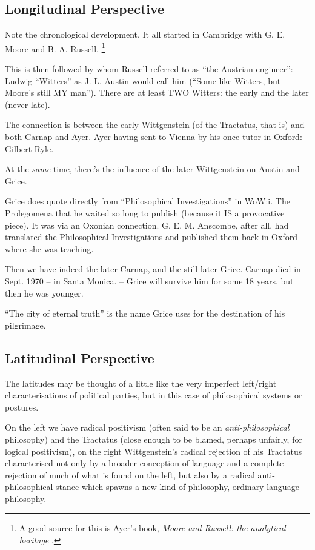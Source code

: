 \documentclass[10pt,titlepage]{book}
\begin{document}
\subsection{Longitudinal Perspective}

Note the chronological development.
It all started in Cambridge with G. E. Moore and B. A. Russell.
\footnote{A good source for this is Ayer's book, \emph{Moore and Russell: the analytical
heritage} \cite{ayer1971}.}

This is then followed by whom Russell referred to as ``the Austrian
engineer'': Ludwig ``Witters'' as J. L. Austin would call him (``Some like
Witters, but Moore's still MY man'').
There are at least TWO Witters: the early and the later (never late).

The connection is between the early Wittgenstein (of the Tractatus, that is) and both Carnap and Ayer.
Ayer having sent to Vienna by his once tutor in Oxford: Gilbert Ryle.

At the \emph{same} time, there's the influence of the later Wittgenstein on Austin and Grice.

Grice does quote directly from ``Philosophical Investigations'' in WoW:i\cite{grice89}.
The Prolegomena that he waited so long to publish (because it IS a provocative piece).
It was via an Oxonian connection.
G. E. M. Anscombe, after all, had translated the Philosophical Investigations and published them back in Oxford
where she was teaching.

Then we have indeed the later Carnap, and the still later Grice.
Carnap died in Sept. 1970 -- in Santa Monica. -- Grice will survive him for
some 18 years, but then he was younger.

``The city of eternal truth'' is the name Grice uses for the destination of his pilgrimage.

\subsection{Latitudinal Perspective}

The latitudes may be thought of a little like the very imperfect left/right characterisations of political parties, but in this case of philosophical systems or postures.

On the left we have radical positivism (often said to be an \emph{anti-philosophical} philosophy) and the Tractatus (close enough to be blamed, perhaps unfairly, for logical positivism), on the right Wittgenstein's radical rejection of his Tractatus characterised not only by a broader conception of language and a complete rejection of much of what is found on the left, but also by a radical anti-philosophical stance which spawns a new kind of philosophy, ordinary language philosophy.
\end{document}
